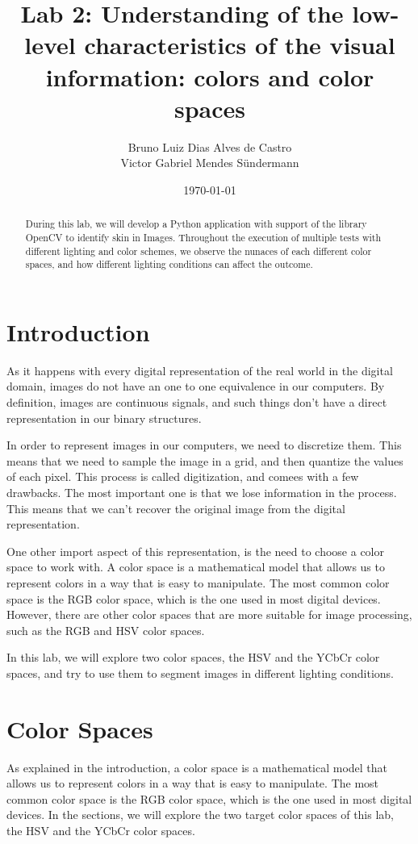 \documentclass[journal]{IEEEtran}
\title{Lab 2: Understanding of the low-level characteristics of the visual information: colors and color spaces}
\author{Bruno Luiz Dias Alves de Castro \\ Victor Gabriel Mendes Sündermann}
\date{\today}
\begin{document}
\maketitle

\begin{abstract}
During this lab, we will develop a Python application with support of the library OpenCV to identify skin in Images. Throughout the execution of multiple tests with different lighting and color schemes, we observe the nunaces of each different color spaces, and how different lighting conditions can affect the outcome.
\end{abstract}

\section{Introduction}
As it happens with every digital representation of the real world in the digital domain, images do not have an one to one equivalence in our computers. By definition, images are continuous signals, and such things don't have a direct representation in our binary structures.

In order to represent images in our computers, we need to discretize them. This means that we need to sample the image in a grid, and then quantize the values of each pixel. This process is called digitization, and comees with a few drawbacks. The most important one is that we lose information in the process. This means that we can't recover the original image from the digital representation.

One other import aspect of this representation, is the need to choose a color space to work with. A color space is a mathematical model that allows us to represent colors in a way that is easy to manipulate. The most common color space is the RGB color space, which is the one used in most digital devices. However, there are other color spaces that are more suitable for image processing, such as the RGB and HSV color spaces.

In this lab, we will explore two color spaces, the HSV and the YCbCr color spaces, and try to use them to segment images in different lighting conditions.

\section{Color Spaces}

As explained in the introduction, a color space is a mathematical model that allows us to represent colors in a way that is easy to manipulate. The most common color space is the RGB color space, which is the one used in most digital devices. In the sections, we will explore the two target color spaces of this lab, the HSV and the YCbCr color spaces.
\end{document}
